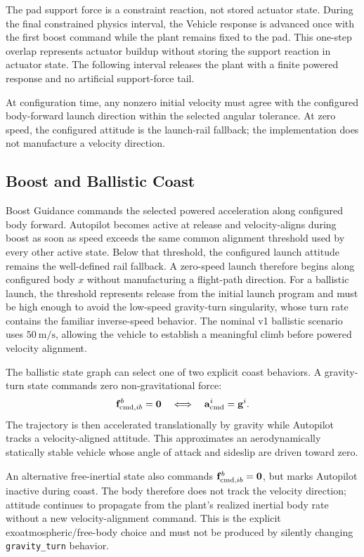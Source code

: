 The pad support force is a constraint reaction, not stored actuator state.
During the final constrained physics interval, the Vehicle response is
advanced once with the first boost command while the plant remains fixed to
the pad. This one-step overlap represents actuator buildup without storing the
support reaction in actuator state. The following interval releases the plant
with a finite powered response and no artificial support-force tail.

At configuration time, any nonzero initial velocity must agree with the
configured body-forward launch direction within the selected angular
tolerance. At zero speed, the configured attitude is the launch-rail fallback;
the implementation does not manufacture a velocity direction.

\subsection{Boost and Ballistic Coast}

Boost Guidance commands the selected powered acceleration along configured
body forward. Autopilot becomes active at release and velocity-aligns during
boost as soon as speed exceeds the same common alignment threshold used by
every other active state. Below that threshold, the configured launch attitude
remains the well-defined rail fallback. A zero-speed launch therefore begins
along configured body $x$ without manufacturing a flight-path direction.
For a ballistic launch, the threshold represents release from the initial
launch program and must be high enough to avoid the low-speed gravity-turn
singularity, whose turn rate contains the familiar inverse-speed behavior.
The nominal v1 ballistic scenario uses \(50~\mathrm{m/s}\), allowing the
vehicle to establish a meaningful climb before powered velocity alignment.

The ballistic state graph can select one of two explicit coast behaviors. A
gravity-turn state commands zero non-gravitational force:
\begin{equation}
\mathbf{f}_{\mathrm{cmd},ib}^{b}=\mathbf{0}
\quad\Longleftrightarrow\quad
\mathbf{a}_{\mathrm{cmd}}^{i}=\mathbf{g}^{i}.
\label{eq:gravity_turn_command}
\end{equation}
The trajectory is then accelerated translationally by gravity while Autopilot
tracks a velocity-aligned attitude. This approximates an aerodynamically
statically stable vehicle whose angle of attack and sideslip are driven toward
zero.

An alternative free-inertial state also commands
$\mathbf{f}_{\mathrm{cmd},ib}^{b}=\mathbf{0}$, but marks Autopilot inactive during
coast. The body therefore does not track the velocity direction; attitude
continues to propagate from the plant's realized inertial body rate without a
new velocity-alignment command. This is the explicit exoatmospheric/free-body
choice and must not be produced by silently changing
\texttt{gravity\_turn} behavior.

